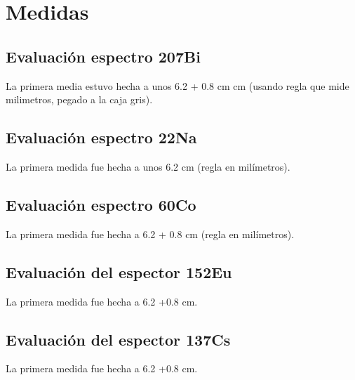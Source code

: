 \documentclass[11pt]{article}
\begin{document}
\section{Medidas}

\subsection{Evaluación espectro 207Bi}

La primera media estuvo hecha a unos 6.2 + 0.8 cm cm (usando regla que mide milimetros, pegado a la caja gris). 

\subsection{Evaluación espectro 22Na}

La primera medida fue hecha a unos 6.2 cm (regla en milímetros).

\subsection{Evaluación espectro 60Co}

La primera medida fue hecha a 6.2 + 0.8 cm (regla en milímetros). 

\subsection{Evaluación del espector 152Eu}

La primera medida fue hecha a 6.2 +0.8 cm.

\subsection{Evaluación del espector 137Cs}

La primera medida fue hecha a 6.2 +0.8 cm.
\end{document}
